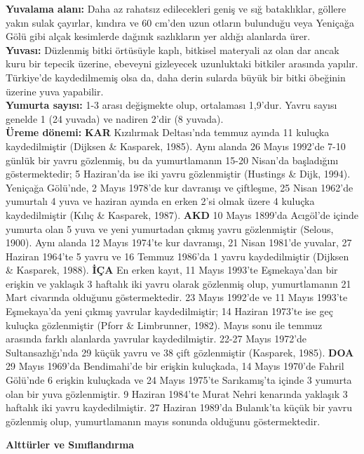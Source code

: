 \documentclass[
  a4paper,
  DIV=11,
  numbers=noendperiod]{scrreprt}
\begin{document}
\textbf{Yuvalama alanı:} Daha az rahatsız edilecekleri geniş ve sığ
bataklıklar, göllere yakın sulak çayırlar, kındıra ve 60 cm'den uzun
otların bulunduğu veya Yeniçağa Gölü gibi alçak kesimlerde dağınık
sazlıkların yer aldığı alanlarda ürer.\\
\textbf{Yuvası:} Düzlenmiş bitki örtüsüyle kaplı, bitkisel materyali az
olan dar ancak kuru bir tepecik üzerine, ebeveyni gizleyecek uzunluktaki
bitkiler arasında yapılır. Türkiye'de kaydedilmemiş olsa da, daha derin
sularda büyük bir bitki öbeğinin üzerine yuva yapabilir.\\
\textbf{Yumurta sayısı:} 1-3 arası değişmekte olup, ortalaması 1,9'dur.
Yavru sayısı genelde 1 (24 yuvada) ve nadiren 2'dir (8 yuvada).\\
\textbf{Üreme dönemi:} \textbf{KAR} Kızılırmak Deltası'nda temmuz ayında
11 kuluçka kaydedilmiştir (Dijksen \& Kasparek, 1985). Aynı alanda 26
Mayıs 1992'de 7-10 günlük bir yavru gözlenmiş, bu da yumurtlamanın 15-20
Nisan'da başladığını göstermektedir; 5 Haziran'da ise iki yavru
gözlenmiştir (Hustings \& Dijk, 1994). Yeniçağa Gölü'nde, 2 Mayıs
1978'de kur davranışı ve çiftleşme, 25 Nisan 1962'de yumurtalı 4 yuva ve
haziran ayında en erken 2'si olmak üzere 4 kuluçka kaydedilmiştir (Kılıç
\& Kasparek, 1987). \textbf{AKD} 10 Mayıs 1899'da Acıgöl'de içinde
yumurta olan 5 yuva ve yeni yumurtadan çıkmış yavru gözlenmiştir
(Selous, 1900). Aynı alanda 12 Mayıs 1974'te kur davranışı, 21 Nisan
1981'de yuvalar, 27 Haziran 1964'te 5 yavru ve 16 Temmuz 1986'da 1 yavru
kaydedilmiştir (Dijksen \& Kasparek, 1988). \textbf{İÇA} En erken kayıt,
11 Mayıs 1993'te Eşmekaya'dan bir erişkin ve yaklaşık 3 haftalık iki
yavru olarak gözlenmiş olup, yumurtlamanın 21 Mart civarında olduğunu
göstermektedir. 23 Mayıs 1992'de ve 11 Mayıs 1993'te Eşmekaya'da yeni
çıkmış yavrular kaydedilmiştir; 14 Haziran 1973'te ise geç kuluçka
gözlenmiştir (Pforr \& Limbrunner, 1982). Mayıs sonu ile temmuz arasında
farklı alanlarda yavrular kaydedilmiştir. 22-27 Mayıs 1972'de
Sultansazlığı'nda 29 küçük yavru ve 38 çift gözlenmiştir (Kasparek,
1985). \textbf{DOA} 29 Mayıs 1969'da Bendimahi'de bir erişkin kuluçkada,
14 Mayıs 1970'de Fahril Gölü'nde 6 erişkin kuluçkada ve 24 Mayıs 1975'te
Sarıkamış'ta içinde 3 yumurta olan bir yuva gözlenmiştir. 9 Haziran
1984'te Murat Nehri kenarında yaklaşık 3 haftalık iki yavru
kaydedilmiştir. 27 Haziran 1989'da Bulanık'ta küçük bir yavru gözlenmiş
olup, yumurtlamanın mayıs sonunda olduğunu göstermektedir.

\textbf{Alttürler ve Sınıflandırma}
\end{document}
